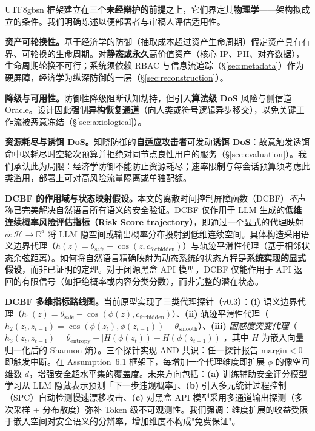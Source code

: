 \documentclass[letterpaper,twocolumn,10pt]{article}
\begin{document}
\begin{CJK}{UTF8}{gbsn}
框架建立在三个\textbf{未经辩护的前提}之上，它们界定其\textbf{物理学}——架构拟成立的条件。我们明确陈述以便部署者与审稿人评估适用性。

\textbf{资产可轮换性。}基于经济学的防御（抽取成本超过资产生命周期）假定资产具有有界、可轮换的生命周期。对\textbf{静态或永久}高价值资产（核心 IP、PII、对齐数据），生命周期轮换不可行；系统须依赖 RBAC 与信息流追踪（\S\ref{sec:metadata}）作为硬屏障，经济学为纵深防御的一层（\S\ref{sec:reconstruction}）。

\textbf{降级与可用性。}防御性降级阻断认知劫持，但引入\textbf{算法级 DoS} 风险与侧信道 Oracle。设计因此强制\textbf{异构恢复通道}（向人类或符号逻辑异步移交），以免关键工作流被恶意冻结（\S\ref{sec:axiological}）。

\textbf{资源耗尽与诱饵 DoS。}知晓防御的\textbf{自适应攻击者}可发动\textbf{诱饵 DoS}：故意触发诱饵命中以耗尽时空轮次预算并拒绝对同节点良性用户的服务（\S\ref{sec:evaluation}）。我们承认此为局限：经济学防御不能防止资源耗尽；速率限制与每会话预算须考虑此类滥用，部署上可对高风险流量隔离或单独配额。

\textbf{DCBF 的作用域与状态映射假设。}本文的离散时间控制屏障函数（DCBF）\emph{不}声称已完美解决自然语言所有语义的安全验证。DCBF 仅作用于 LLM 生成的\textbf{低维连续概率风险评估指标（Risk Score trajectory）}，即通过一个显式的代理映射 $\phi: \mathcal{H} \to \mathbb{R}^d$ 将 LLM 隐空间或输出概率分布投射到低维连续空间。具体构造采用语义边界代理（$h(z) = \theta_{\mathrm{safe}} - \cos(z, c_{\mathrm{forbidden}})$）与轨迹平滑性代理（基于相邻状态余弦距离）。如何将自然语言精确映射为动态系统的状态方程是\textbf{系统实现的显式假设}，而非已证明的定理。对于闭源黑盒 API 模型，DCBF 仅能作用于 API 返回的有限信号（如拒绝概率或内容分类分数），而非完整的潜在状态。

\textbf{DCBF 多维指标路线图。}当前原型实现了三类代理探针（v0.3）：\textbf{(i)} 语义边界代理（$h_1(z) = \theta_{\mathrm{safe}} - \cos(\phi(z), c_{\mathrm{forbidden}})$）、\textbf{(ii)} 轨迹平滑性代理（$h_2(z_t, z_{t-1}) = \cos(\phi(z_t), \phi(z_{t-1})) - \theta_{\mathrm{smooth}}$）、\textbf{(iii)} \emph{困惑度突变代理}（$h_3(z_t, z_{t-1}) = \theta_{\mathrm{entropy}} - |H(\phi(z_t)) - H(\phi(z_{t-1}))|$，其中 $H$ 为嵌入向量归一化后的 Shannon 熵）。三个探针实现 AND 共识：任一探针报告 $\mathrm{margin} < 0$ 即触发中断。在 Assumption~6.1 框架下，每增加一个代理维度即扩展 $\phi$ 的像空间维数 $d$，增强安全超水平集的覆盖度。未来方向包括：\textbf{(a)} 训练辅助安全评分模型学习从 LLM 隐藏表示预测「下一步违规概率」、\textbf{(b)} 引入多元统计过程控制（SPC）自动检测慢速漂移攻击、\textbf{(c)} 对黑盒 API 模型采用多通道输出探测（多次采样 + 分布散度）弥补 Token 级不可观测性。我们强调：维度扩展的收益受限于嵌入空间对安全语义的分辨率，增加维度不构成"免费保证"。


\end{CJK}
\end{document}
